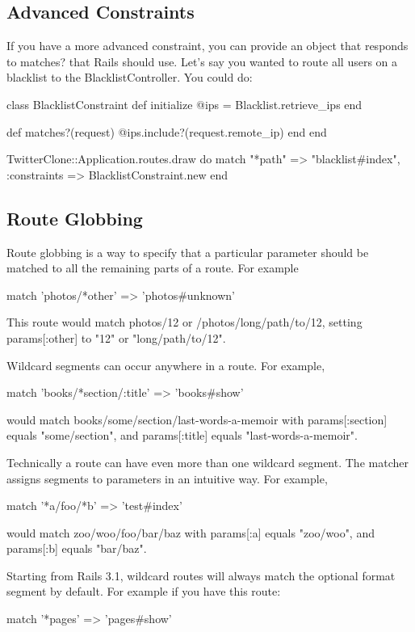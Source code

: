 \documentclass[10pt]{book}
\newenvironment{code}{%
  \scriptsize
    \verbatim
}{%
    \endverbatim
    \newline
}
\begin{document}
\subsection{ Advanced Constraints}

If you have a more advanced constraint, you can provide an object that responds to matches? that Rails should use. Let’s say you wanted to route all users on a blacklist to the BlacklistController. You could do:
\begin{code}
class BlacklistConstraint
  def initialize
    @ips = Blacklist.retrieve_ips
  end
 
  def matches?(request)
    @ips.include?(request.remote_ip)
  end
end
 
TwitterClone::Application.routes.draw do
  match "*path" => "blacklist#index",
    :constraints => BlacklistConstraint.new
end
\end{code}

\subsection{ Route Globbing}

Route globbing is a way to specify that a particular parameter should  be matched to all the remaining parts of a route. For example
\begin{code}
match 'photos/*other' => 'photos#unknown'
\end{code}

This route would match photos/12 or /photos/long/path/to/12, setting params[:other] to "12" or "long/path/to/12".

Wildcard segments can occur anywhere in a route. For example,
\begin{code}
match 'books/*section/:title' => 'books#show'
\end{code}

would match books/some/section/last-words-a-memoir with params[:section] equals "some/section", and params[:title] equals "last-words-a-memoir".

Technically a route can have even more than one wildcard segment. The  matcher assigns segments to parameters in an intuitive way. For  example,
\begin{code}
match '*a/foo/*b' => 'test#index'
\end{code}

would match zoo/woo/foo/bar/baz with params[:a] equals "zoo/woo", and params[:b] equals "bar/baz".

Starting from Rails 3.1, wildcard routes will  always match the optional format segment by default. For example if you  have this route:
\begin{code}
match '*pages' => 'pages#show'
\end{code}
\end{document}
